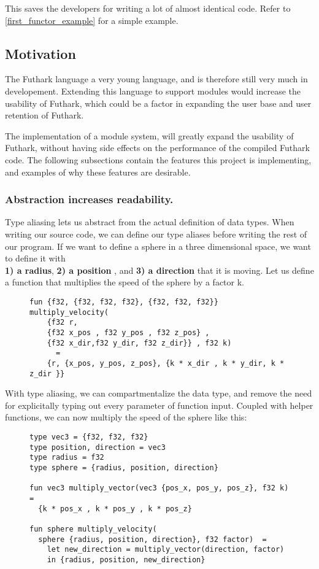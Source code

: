 This saves the developers for writing a lot of almost identical code. Refer to
\ref{first_functor_example} for a simple example.
\pagebreak
\subsection{Motivation}
\label{subsec:label}
The Futhark language a very young language, and is therefore still very much in
developement.
Extending this language to support modules would increase the usability of
Futhark, which could be a factor in expanding the user base and user retention
of Futhark.

The implementation of a module system, will greatly expand the usability of
Futhark, without having side effects on the performance of the compiled Futhark code.
The following subsections contain the features this project is implementing, and
examples of why these features are desirable.\\

\subsubsection{Abstraction increases readability.} 
Type aliasing lets us abstract
from the actual definition of data types.
When writing our source code, we can define our type aliases before writing the
rest of our program.
If we want to define a sphere in a three dimensional space, we want to define it
with \\
\textbf{1) a radius}, \textbf{2) a position} , and \textbf{3) a direction} that it is
moving. 
Let us define a function that multiplies the speed of the sphere by a factor k.
\begin{figure}[h]
\begin{lstlisting}
fun {f32, {f32, f32, f32}, {f32, f32, f32}} multiply_velocity(
	{f32 r, 
	{f32 x_pos , f32 y_pos , f32 z_pos} , 
	{f32 x_dir,f32 y_dir, f32 z_dir}} , f32 k) 
	  =
    {r, {x_pos, y_pos, z_pos}, {k * x_dir , k * y_dir, k * z_dir }}
\end{lstlisting}
\end{figure}
\clearpage
\noindent
With type aliasing, we can compartmentalize the data type, and remove the need
for explicitally typing out every parameter of function input.
Coupled with helper functions, we can now multiply the speed of the sphere like
this:
\begin{figure}[h]
\begin{verbatim}
type vec3 = {f32, f32, f32}
type position, direction = vec3 
type radius = f32
type sphere = {radius, position, direction}

fun vec3 multiply_vector(vec3 {pos_x, pos_y, pos_z}, f32 k) =
  {k * pos_x , k * pos_y , k * pos_z}

fun sphere multiply_velocity(
  sphere {radius, position, direction}, f32 factor)  =
    let new_direction = multiply_vector(direction, factor)
    in {radius, position, new_direction}
\end{verbatim}
\end{figure}

